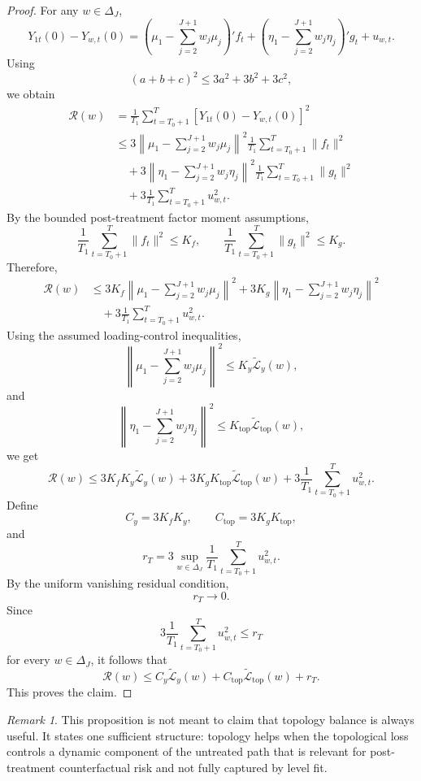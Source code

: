 \documentclass[11pt]{article}
\theoremstyle{plain}
\theoremstyle{definition}
\theoremstyle{remark}
\newtheorem{remark}[remark]{Remark}
\newcommand{\1}{\mathbbm{1}}
\begin{document}
\begin{proof}
For any \(w\in\Delta_J\),
\[
Y_{1t}(0)-Y_{w,t}(0)
=
\left(
\mu_1-\sum_{j=2}^{J+1}w_j\mu_j
\right)'f_t
+
\left(
\eta_1-\sum_{j=2}^{J+1}w_j\eta_j
\right)'g_t
+
u_{w,t}.
\]
Using
\[
(a+b+c)^2\le 3a^2+3b^2+3c^2,
\]
we obtain
\[
\begin{aligned}
\mathcal R(w)
&=
\frac{1}{T_1}
\sum_{t=T_0+1}^{T}
\left[
Y_{1t}(0)-Y_{w,t}(0)
\right]^2
\\
&\le
3
\left\|
\mu_1-\sum_{j=2}^{J+1}w_j\mu_j
\right\|^2
\frac{1}{T_1}
\sum_{t=T_0+1}^{T}
\|f_t\|^2
\\
&\quad+
3
\left\|
\eta_1-\sum_{j=2}^{J+1}w_j\eta_j
\right\|^2
\frac{1}{T_1}
\sum_{t=T_0+1}^{T}
\|g_t\|^2
\\
&\quad+
3
\frac{1}{T_1}
\sum_{t=T_0+1}^{T}
u_{w,t}^2.
\end{aligned}
\]
By the bounded post-treatment factor moment assumptions,
\[
\frac{1}{T_1}
\sum_{t=T_0+1}^{T}
\|f_t\|^2
\le K_f,
\qquad
\frac{1}{T_1}
\sum_{t=T_0+1}^{T}
\|g_t\|^2
\le K_g.
\]
Therefore,
\[
\begin{aligned}
\mathcal R(w)
&\le
3K_f
\left\|
\mu_1-\sum_{j=2}^{J+1}w_j\mu_j
\right\|^2
+
3K_g
\left\|
\eta_1-\sum_{j=2}^{J+1}w_j\eta_j
\right\|^2
\\
&\quad+
3
\frac{1}{T_1}
\sum_{t=T_0+1}^{T}
u_{w,t}^2.
\end{aligned}
\]
Using the assumed loading-control inequalities,
\[
\left\|
\mu_1-\sum_{j=2}^{J+1}w_j\mu_j
\right\|^2
\le
K_y\widetilde{\mathcal L}_y(w),
\]
and
\[
\left\|
\eta_1-\sum_{j=2}^{J+1}w_j\eta_j
\right\|^2
\le
K_{\mathrm{top}}
\widetilde{\mathcal L}_{\mathrm{top}}(w),
\]
we get
\[
\mathcal R(w)
\le
3K_fK_y
\widetilde{\mathcal L}_y(w)
+
3K_gK_{\mathrm{top}}
\widetilde{\mathcal L}_{\mathrm{top}}(w)
+
3
\frac{1}{T_1}
\sum_{t=T_0+1}^{T}
u_{w,t}^2.
\]
Define
\[
C_y=3K_fK_y,
\qquad
C_{\mathrm{top}}=3K_gK_{\mathrm{top}},
\]
and
\[
r_T
=
3
\sup_{w\in\Delta_J}
\frac{1}{T_1}
\sum_{t=T_0+1}^{T}
u_{w,t}^2.
\]
By the uniform vanishing residual condition,
\[
r_T\to0.
\]
Since
\[
3
\frac{1}{T_1}
\sum_{t=T_0+1}^{T}
u_{w,t}^2
\le
r_T
\]
for every \(w\in\Delta_J\), it follows that
\[
\mathcal R(w)
\le
C_y\widetilde{\mathcal L}_y(w)
+
C_{\mathrm{top}}\widetilde{\mathcal L}_{\mathrm{top}}(w)
+
r_T.
\]
This proves the claim.
\end{proof}

\begin{remark}
This proposition is not meant to claim that topology balance is always useful.
It states one sufficient structure: topology helps when the topological loss
controls a dynamic component of the untreated path that is relevant for
post-treatment counterfactual risk and not fully captured by level fit.
\end{remark}
\end{document}
